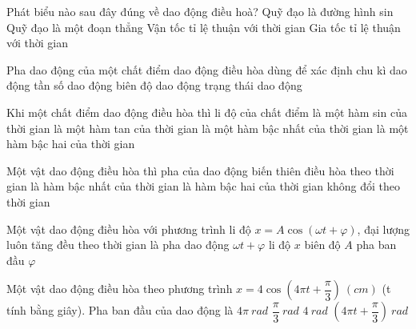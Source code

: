\begin{ex}
Phát biểu nào sau đây đúng về dao động điều hoà?
\choice
{Quỹ đạo là đường hình sin}
{\True Quỹ đạo là một đoạn thẳng}
{Vận tốc tỉ lệ thuận với thời gian}
{Gia tốc tỉ lệ thuận với thời gian}
\end{ex} 
\begin{ex}
Pha dao động của một chất điểm dao động điều hòa dùng để xác định
\choice
{chu kì dao động}
{tần số dao động}
{biên độ dao động}
{\True trạng thái dao động}
\end{ex} 
\begin{ex} %
Khi một chất điểm dao động điều hòa thì li độ của chất điểm là
\choice
{\True một hàm sin của thời gian}
{là một hàm tan của thời gian}
{là một hàm bậc nhất của thời gian}
{là một hàm bậc hai của thời gian}
\end{ex} 
\begin{ex}%
Một vật dao động điều hòa thì pha của dao động
\choice
{biến thiên điều hòa theo thời gian}
{\True là hàm bậc nhất của thời gian}
{là hàm bậc hai của thời gian}
{không đổi theo thời gian}
\end{ex} 
\begin{ex}
Một vật dao động điều hòa với phương trình li độ $x=A \cos (\omega t+\varphi)$, đại lượng luôn tăng đều theo thời gian là
\choice
{\True pha dao động $\omega t+\varphi$}
{li độ $x$}
{biên độ $A$}
{pha ban đầu $\varphi$}
\end{ex}
\begin{ex}
Một vật dao động điều hòa theo phương trình $x=4 \cos \left(4 \pi t+\dfrac{\pi}{3}\right)\ (cm)$ (t tính bằng giây). Pha ban đầu của dao động là
\choice
{$4\pi\ rad$}
{\True $\dfrac{\pi}{3}\ rad$}
{$4\ rad$}
{$\left(4\pi t+\dfrac{\pi}{3}\right)\ rad$}
\end{ex}
